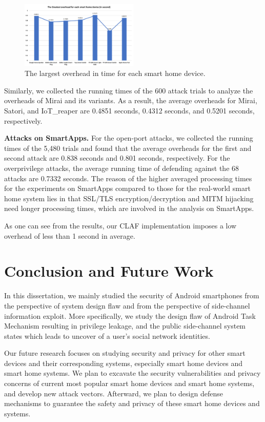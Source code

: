 \documentclass[letterpaper,12pt]{article}
\begin{document}
\begin{figure}[!htb]
        \centering
        \includegraphics[width=0.5\textwidth]{overhead.png}
        \caption{The largest overhead in time for each smart home device.}
        \label{fig:overhead}
\end{figure}

Similarly, we collected the running times of the 600 attack trials to analyze the overheads of Mirai and its variants. As a result, the average overheads for Mirai, Satori, and IoT\_reaper are 0.4851 seconds, 0.4312 seconds, and 0.5201 seconds, respectively.

\textbf{Attacks on SmartApps.} 
For the open-port attacks, we collected the running times of the 5,480 trials and found that the average overheads for the first and second attack are 0.838 seconds and 0.801 seconds, respectively. For the overprivilege attacks, the average running time of defending against the 68 attacks are 0.7332 seconds. The reason of the higher averaged processing times for the experiments on SmartApps compared to those for the real-world smart home system lies in that SSL/TLS encryption/decryption and MITM hijacking need longer processing times, which are involved in the analysis on SmartApps.

As one can see from the results, our CLAF implementation imposes a low overhead of less than 1 second in average. 


\section{Conclusion and Future Work}\label{sec:conclusion}
In this dissertation, we mainly studied the security of Android smartphones from the perspective of system design flaw and from the perspective of side-channel information exploit. More specifically, we study the design flaw of Android Task Mechanism resulting in privilege leakage, and the public side-channel system states which leads to uncover of a user's social network identities. 

Our future research focuses on studying security and privacy for other smart devices and their corresponding systems, especially smart home devices and smart home systems. We plan to excavate the security vulnerabilities and privacy concerns of current most popular smart home devices and smart home systems, and develop new attack vectors. Afterward, we plan to design defense mechanisms to guarantee the safety and privacy of these smart home devices and systems. 

        \newpage
   
   
\end{document}
